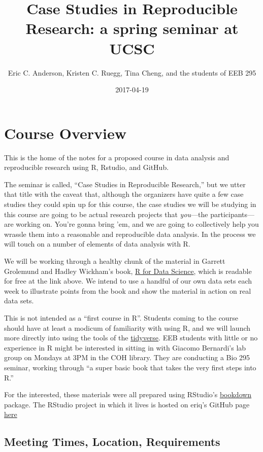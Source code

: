 \documentclass[]{book}
\title{Case Studies in Reproducible Research: a spring seminar at UCSC}
\author{Eric C. Anderson, Kristen C. Ruegg, Tina Cheng, and the students of EEB
295}
\date{2017-04-19}
\theoremstyle{definition}
\theoremstyle{definition}
\theoremstyle{remark}
\begin{document}
\maketitle

{
\setcounter{tocdepth}{1}
\tableofcontents
}
\chapter{Course Overview}\label{course-overview}

This is the home of the notes for a proposed course in data analysis and
reproducible research using R, Rstudio, and GitHub.

The seminar is called, ``Case Studies in Reproducible Research,'' but we
utter that title with the caveat that, although the organizers have
quite a few case studies they could spin up for this course, the case
studies we will be studying in this course are going to be actual
research projects that \emph{you}---the participants---are working on.
You're gonna bring 'em, and we are going to collectively help you
wrassle them into a reasonable and reproducible data analysis. In the
process we will touch on a number of elements of data analysis with R.

We will be working through a healthy chunk of the material in Garrett
Grolemund and Hadley Wickham's book, \href{http://r4ds.had.co.nz/}{R for
Data Science}, which is readable for free at the link above. We intend
to use a handful of our own data sets each week to illustrate points
from the book and show the material in action on real data sets.

This is not intended as a ``first course in R''. Students coming to the
course should have at least a modicum of familiarity with using R, and
we will launch more directly into using the tools of the
\href{http://tidyverse.org/}{tidyverse}. EEB students with little or no
experience in R might be interested in sitting in with Giacomo
Bernardi's lab group on Mondays at 3PM in the COH library. They are
conducting a Bio 295 seminar, working through ``a super basic book that
takes the very first steps into R.''

For the interested, these materials were all prepared using RStudio's
\href{https://bookdown.org/}{bookdown} package. The RStudio project in
which it lives is hosted on eriq's GitHub page
\href{https://github.com/eriqande/rep-res-eeb-2017}{here}

\section{Meeting Times, Location,
Requirements}\label{meeting-times-location-requirements}
\end{document}

